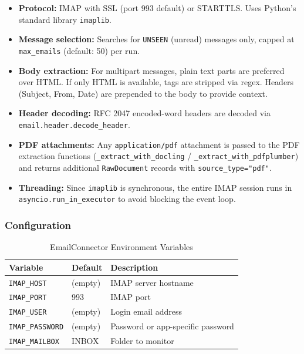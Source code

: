 \documentclass[12pt,a4paper]{article}
\begin{document}
\begin{itemize}[noitemsep]
  \item \textbf{Protocol:} IMAP with SSL (port 993 default) or STARTTLS. Uses Python's standard library \texttt{imaplib}.
  \item \textbf{Message selection:} Searches for \texttt{UNSEEN} (unread) messages only, capped at \texttt{max\_emails} (default: 50) per run.
  \item \textbf{Body extraction:} For multipart messages, plain text parts are preferred over HTML. If only HTML is available, tags are stripped via regex. Headers (Subject, From, Date) are prepended to the body to provide context.
  \item \textbf{Header decoding:} RFC 2047 encoded-word headers are decoded via \texttt{email.header.decode\_header}.
  \item \textbf{PDF attachments:} Any \texttt{application/pdf} attachment is passed to the PDF extraction functions (\texttt{\_extract\_with\_docling} / \texttt{\_extract\_with\_pdfplumber}) and returns additional \texttt{RawDocument} records with \texttt{source\_type="pdf"}.
  \item \textbf{Threading:} Since \texttt{imaplib} is synchronous, the entire IMAP session runs in \texttt{asyncio.run\_in\_executor} to avoid blocking the event loop.
\end{itemize}

\subsubsection{Configuration}

\begin{table}[H]
\centering
\caption{EmailConnector Environment Variables}\label{tab:emailenv}
\begin{tabularx}{\textwidth}{@{}l l X@{}}
\toprule
\textbf{Variable} & \textbf{Default} & \textbf{Description} \\
\midrule
\texttt{IMAP\_HOST}     & (empty)  & IMAP server hostname \\
\texttt{IMAP\_PORT}     & 993      & IMAP port \\
\texttt{IMAP\_USER}     & (empty)  & Login email address \\
\texttt{IMAP\_PASSWORD} & (empty)  & Password or app-specific password \\
\texttt{IMAP\_MAILBOX}  & INBOX    & Folder to monitor \\
\bottomrule
\end{tabularx}
\end{table}
\end{document}
